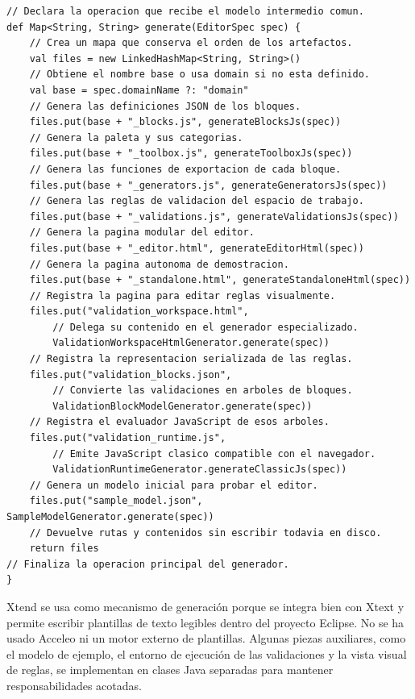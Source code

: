 \begin{lstlisting}[style=tfmxtend, captionpos=t, caption={Método de entrada de \texttt{BlocklyCodeGenerator.xtend} comentado línea a línea}, label={lst:entrada-generador-xtend}]
// Declara la operacion que recibe el modelo intermedio comun.
def Map<String, String> generate(EditorSpec spec) {
    // Crea un mapa que conserva el orden de los artefactos.
    val files = new LinkedHashMap<String, String>()
    // Obtiene el nombre base o usa domain si no esta definido.
    val base = spec.domainName ?: "domain"
    // Genera las definiciones JSON de los bloques.
    files.put(base + "_blocks.js", generateBlocksJs(spec))
    // Genera la paleta y sus categorias.
    files.put(base + "_toolbox.js", generateToolboxJs(spec))
    // Genera las funciones de exportacion de cada bloque.
    files.put(base + "_generators.js", generateGeneratorsJs(spec))
    // Genera las reglas de validacion del espacio de trabajo.
    files.put(base + "_validations.js", generateValidationsJs(spec))
    // Genera la pagina modular del editor.
    files.put(base + "_editor.html", generateEditorHtml(spec))
    // Genera la pagina autonoma de demostracion.
    files.put(base + "_standalone.html", generateStandaloneHtml(spec))
    // Registra la pagina para editar reglas visualmente.
    files.put("validation_workspace.html",
        // Delega su contenido en el generador especializado.
        ValidationWorkspaceHtmlGenerator.generate(spec))
    // Registra la representacion serializada de las reglas.
    files.put("validation_blocks.json",
        // Convierte las validaciones en arboles de bloques.
        ValidationBlockModelGenerator.generate(spec))
    // Registra el evaluador JavaScript de esos arboles.
    files.put("validation_runtime.js",
        // Emite JavaScript clasico compatible con el navegador.
        ValidationRuntimeGenerator.generateClassicJs(spec))
    // Genera un modelo inicial para probar el editor.
    files.put("sample_model.json", SampleModelGenerator.generate(spec))
    // Devuelve rutas y contenidos sin escribir todavia en disco.
    return files
// Finaliza la operacion principal del generador.
}
\end{lstlisting}

Xtend se usa como mecanismo de generación porque se integra bien con Xtext y
permite escribir plantillas de
texto legibles dentro del proyecto Eclipse. No se ha usado Acceleo ni un motor
externo de plantillas. Algunas piezas auxiliares, como el modelo de ejemplo, el
entorno de ejecución de las validaciones y la vista visual de reglas, se implementan en clases
Java separadas para mantener responsabilidades acotadas.


